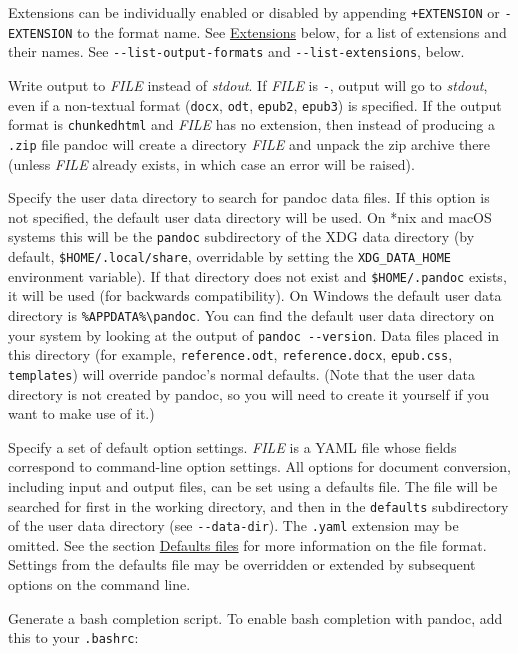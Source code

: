 \documentclass[
  b5paper
]{book}
\begin{document}
\begin{description}
Extensions can be individually enabled or disabled by appending
\texttt{+EXTENSION} or \texttt{-EXTENSION} to the format name. See
\hyperref[extensions]{Extensions} below, for a list of extensions and
their names. See \texttt{-\/-list-output-formats} and
\texttt{-\/-list-extensions}, below.
\item[\texttt{-o} \emph{FILE}, \texttt{-\/-output=}\emph{FILE}]
Write output to \emph{FILE} instead of \emph{stdout}. If \emph{FILE} is
\texttt{-}, output will go to \emph{stdout}, even if a non-textual
format (\texttt{docx}, \texttt{odt}, \texttt{epub2}, \texttt{epub3}) is
specified. If the output format is \texttt{chunkedhtml} and \emph{FILE}
has no extension, then instead of producing a \texttt{.zip} file pandoc
will create a directory \emph{FILE} and unpack the zip archive there
(unless \emph{FILE} already exists, in which case an error will be
raised).
\item[\texttt{-\/-data-dir=}\emph{DIRECTORY}]
Specify the user data directory to search for pandoc data files. If this
option is not specified, the default user data directory will be used.
On *nix and macOS systems this will be the \texttt{pandoc} subdirectory
of the XDG data directory (by default, \texttt{\$HOME/.local/share},
overridable by setting the \texttt{XDG\_DATA\_HOME} environment
variable). If that directory does not exist and \texttt{\$HOME/.pandoc}
exists, it will be used (for backwards compatibility). On Windows the
default user data directory is
\texttt{\%APPDATA\%\textbackslash{}pandoc}. You can find the default
user data directory on your system by looking at the output of
\texttt{pandoc\ -\/-version}. Data files placed in this directory (for
example, \texttt{reference.odt}, \texttt{reference.docx},
\texttt{epub.css}, \texttt{templates}) will override pandoc's normal
defaults. (Note that the user data directory is not created by pandoc,
so you will need to create it yourself if you want to make use of it.)
\item[\texttt{-d} \emph{FILE}, \texttt{-\/-defaults=}\emph{FILE}]
Specify a set of default option settings. \emph{FILE} is a YAML file
whose fields correspond to command-line option settings. All options for
document conversion, including input and output files, can be set using
a defaults file. The file will be searched for first in the working
directory, and then in the \texttt{defaults} subdirectory of the user
data directory (see \texttt{-\/-data-dir}). The \texttt{.yaml} extension
may be omitted. See the section \hyperref[defaults-files]{Defaults
files} for more information on the file format. Settings from the
defaults file may be overridden or extended by subsequent options on the
command line.
\item[\texttt{-\/-bash-completion}]
Generate a bash completion script. To enable bash completion with
pandoc, add this to your \texttt{.bashrc}:


\end{description}
\end{document}
